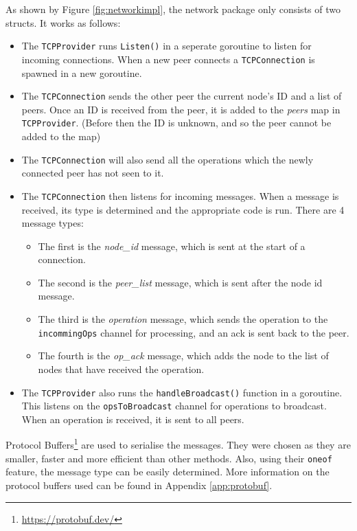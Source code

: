 \documentclass[12pt]{report}
\begin{document}
As shown by Figure \ref{fig:networkimpl}, the network package only consists of two structs. It works as follows: 
\begin{itemize}
    \item The \texttt{TCPProvider} runs \texttt{Listen()} in a seperate goroutine to listen for incoming connections. When a new peer connects a \texttt{TCPConnection} is spawned in a new goroutine.
    \item The \texttt{TCPConnection} sends the other peer the current node's ID and a list of peers. Once an ID is received from the peer, it is added to the \textit{peers} map in \texttt{TCPProvider}. (Before then the ID is unknown, and so the peer cannot be added to the map)
    \item The \texttt{TCPConnection} will also send all the operations which the newly connected peer has not seen to it.
    \item The \texttt{TCPConnection} then listens for incoming messages. When a message is received, its type is determined and the appropriate code is run. There are 4 message types:
    \begin{itemize}
        \item The first is the \textit{node\_id} message, which is sent at the start of a connection. 
        \item The second is the \textit{peer\_list} message, which is sent after the node id message. 
        \item The third is the \textit{operation} message, which sends the operation to the \texttt{incommingOps} channel for processing, and an ack is sent back to the peer.
        \item The fourth is the \textit{op\_ack} message, which adds the node to the list of nodes that have received the operation.
    \end{itemize} 
    \item The \texttt{TCPProvider} also runs the \texttt{handleBroadcast()} function in a goroutine. This listens on the \texttt{opsToBroadcast} channel for operations to broadcast. When an operation is received, it is sent to all peers. 
\end{itemize}
Protocol Buffers\footnote{\url{https://protobuf.dev/}} are used to serialise the messages. They were chosen as they are smaller, faster and more efficient than other methods. Also, using their \texttt{oneof} feature, the message type can be easily determined. More information on the protocol buffers used can be found in Appendix \ref{app:protobuf}. \par
\end{document}
